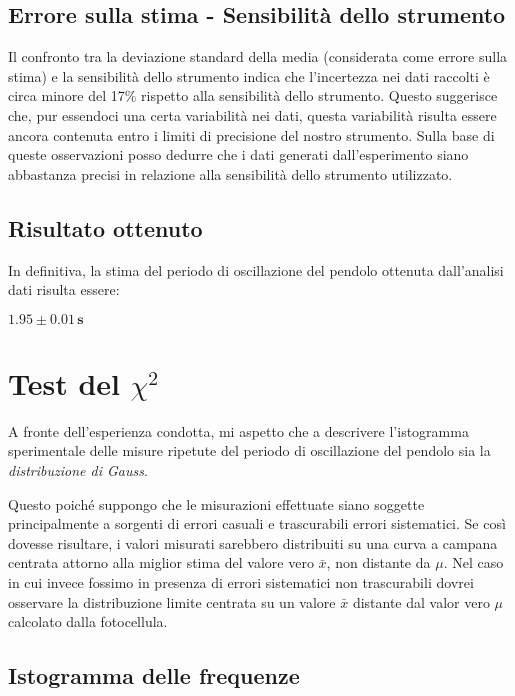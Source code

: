 \documentclass{article}
\begin{document}
\subsection{Errore sulla stima - Sensibilità dello strumento}
\label{errore}
Il confronto tra la deviazione standard della media (considerata come errore sulla stima) e la sensibilità dello strumento indica che l'incertezza nei dati raccolti è circa minore del 17\% rispetto alla sensibilità dello strumento. Questo suggerisce che, pur essendoci una certa variabilità nei dati, questa variabilità risulta essere ancora contenuta entro i limiti di precisione del nostro strumento. Sulla base di queste osservazioni posso dedurre che i dati generati dall'esperimento siano abbastanza precisi in relazione alla sensibilità dello strumento utilizzato.

\subsection{Risultato ottenuto}
In definitiva, la stima del periodo di oscillazione del pendolo ottenuta dall'analisi dati risulta essere: 
\begin{center}
$\mathbf{1.95 \pm 0.01 \, \text{s}}$
\end{center}

\section{Test del $\chi^2$}
A fronte dell'esperienza condotta, mi aspetto che a descrivere l'istogramma sperimentale delle misure ripetute del periodo di oscillazione del pendolo sia la \textit{distribuzione di Gauss}.

Questo poiché suppongo che le misurazioni effettuate siano soggette principalmente a sorgenti di errori casuali e trascurabili errori sistematici. Se così dovesse risultare, i valori misurati sarebbero distribuiti su una curva a campana centrata attorno alla miglior stima del valore vero $\bar{x}$, non distante da $\mu$. 
Nel caso in cui invece fossimo in presenza di errori sistematici non trascurabili dovrei osservare la distribuzione limite centrata su un valore $\bar{x}$ distante dal valor vero $\mu$ calcolato dalla fotocellula.

\subsection{Istogramma delle frequenze}
\end{document}
